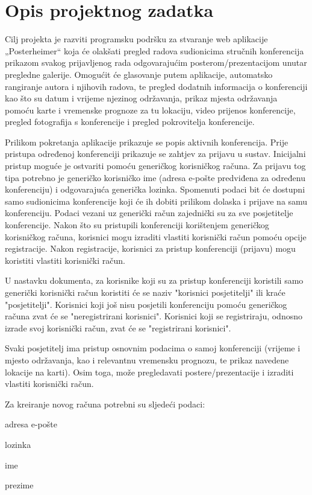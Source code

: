 \chapter{Opis projektnog zadatka}
		
		Cilj projekta je razviti programsku podršku za stvaranje web aplikacije „Posterheimer“ koja će olakšati pregled radova sudionicima stručnih konferencija prikazom svakog prijavljenog rada odgovarajućim posterom/prezentacijom unutar pregledne galerije. Omogućit će glasovanje putem aplikacije, automatsko rangiranje autora i njihovih radova, te pregled dodatnih informacija o konferenciji kao što su datum i vrijeme njezinog održavanja, prikaz mjesta održavanja pomoću karte i vremenske prognoze za tu lokaciju, video prijenos konferencije, pregled fotografija s konferencije i pregled pokrovitelja konferencije.
		
		Prilikom pokretanja aplikacije prikazuje se popis aktivnih konferencija. Prije pristupa određenoj konferenciji prikazuje se zahtjev za prijavu u sustav. Inicijalni pristup moguće je ostvariti pomoću generičkog korisničkog računa. Za prijavu tog tipa potrebno je generičko korisničko ime (adresa e-pošte predviđena za određenu konferenciju) i odgovarajuća generička lozinka. Spomenuti podaci bit će dostupni samo sudionicima konferencije koji će ih dobiti prilikom dolaska i prijave na samu konferenciju. Podaci vezani uz generički račun zajednički su za sve posjetitelje konferencije. Nakon što su pristupili konferenciji korištenjem generičkog korisničkog računa, korisnici mogu izraditi vlastiti korisnički račun pomoću opcije registracije. Nakon registracije, korisnici za pristup konferenciji (prijavu) mogu koristiti vlastiti korisnički račun. 

		U nastavku dokumenta, za korisnike koji su za pristup konferenciji koristili samo generički korisnički račun koristiti će se naziv "korisnici posjetitelji" ili kraće "posjetitelji". Korisnici koji još nisu posjetili konferenciju pomoću generičkog računa zvat će se "neregistrirani korisnici". Korisnici koji se registriraju, odnosno izrade svoj korisnički račun, zvat će se "registrirani korisnici". 
		
		Svaki posjetitelj ima pristup osnovnim podacima o samoj konferenciji (vrijeme i mjesto održavanja, kao i relevantnu vremensku prognozu, te prikaz navedene lokacije na karti). Osim toga, može pregledavati postere/prezentacije i izraditi vlastiti korisnički račun.
		
		\newpage
		
		Za kreiranje novog računa potrebni su sljedeći podaci:
		\begin{packed_item}
			\item adresa e-pošte
			\item lozinka
			\item ime
			\item prezime
		\end{packed_item}
		
